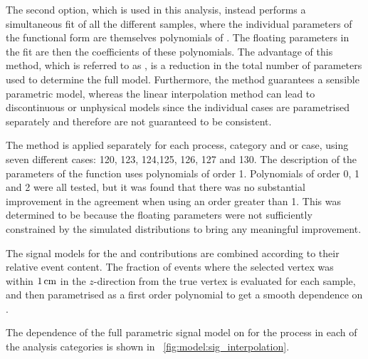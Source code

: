 The second option, which is used in this analysis, instead performs a simultaneous fit of all the different \mH samples, where the individual parameters of the functional form are themselves polynomials of \mH. %
The floating parameters in the fit are then the coefficients of these polynomials. %
The advantage of this method, which is referred to as \SSF, is a reduction in the total number of parameters used to determine the full model. %
Furthermore, the \SSF method guarantees a sensible parametric model, whereas the linear interpolation method can lead to discontinuous or unphysical models since the individual \mH cases are parametrised separately and therefore are not guaranteed to be consistent. 

The \SSF method is applied separately for each process, category and \RV or \WV case, using seven different \mH cases: 120, 123, 124,125, 126, 127 and 130\GeV. The description of the parameters of the \DCBpG function uses polynomials of order 1. Polynomials of order 0, 1 and 2 were all tested, but it was found that there was no substantial improvement in the agreement when using an order greater than 1. This was determined to be because the floating parameters were not sufficiently constrained by the simulated \mgg distributions to bring any meaningful improvement.

The signal models for the \RV and \WV contributions are combined according to their relative event content. The fraction of events where the selected vertex was within $1\,\text{cm}$ in the $z$-direction from the true vertex is evaluated for each \mH sample, and then parametrised as a first order polynomial to get a smooth dependence on \mH. 

The dependence of the full parametric signal model on \mH for the \ggH process in each of the analysis categories is shown in \Fig~\ref{fig:model:sig_interpolation}. 

